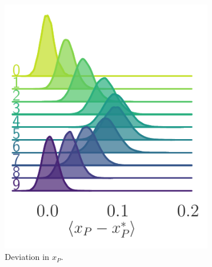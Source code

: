 \documentclass[a4paper,11pt]{article}
\begin{document}
\begin{figure}[htpb]
    \centering
    \begin{subfigure}[t]{0.325\textwidth}
        \includegraphics[width=\textwidth]{assets/ridgeplots/plaqsf.pdf}
        \caption{\label{fig:plaqsf_ridgeplot}Deviation in \(x_{P}\).}
    \end{subfigure}
    \hfill
    \begin{subfigure}[t]{0.32\textwidth}

\end{subfigure}
\end{figure}
\end{document}
